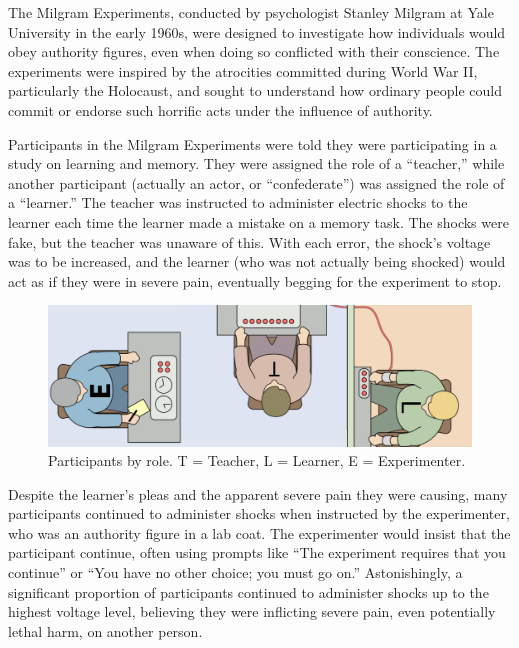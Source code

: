 \documentclass[
]{book}
\begin{document}
The Milgram Experiments, conducted by psychologist Stanley Milgram at Yale University in the early 1960s, were designed to investigate how individuals would obey authority figures, even when doing so conflicted with their conscience. The experiments were inspired by the atrocities committed during World War II, particularly the Holocaust, and sought to understand how ordinary people could commit or endorse such horrific acts under the influence of authority.

Participants in the Milgram Experiments were told they were participating in a study on learning and memory. They were assigned the role of a ``teacher,'' while another participant (actually an actor, or ``confederate'') was assigned the role of a ``learner.'' The teacher was instructed to administer electric shocks to the learner each time the learner made a mistake on a memory task. The shocks were fake, but the teacher was unaware of this. With each error, the shock's voltage was to be increased, and the learner (who was not actually being shocked) would act as if they were in severe pain, eventually begging for the experiment to stop.

\begin{figure}
\centering
\includegraphics[width=1\linewidth,height=\textheight,keepaspectratio]{images/Milgram_experiment.png}
\caption{Participants by role. T = Teacher, L = Learner, E = Experimenter.}
\end{figure}

Despite the learner's pleas and the apparent severe pain they were causing, many participants continued to administer shocks when instructed by the experimenter, who was an authority figure in a lab coat. The experimenter would insist that the participant continue, often using prompts like ``The experiment requires that you continue'' or ``You have no other choice; you must go on.'' Astonishingly, a significant proportion of participants continued to administer shocks up to the highest voltage level, believing they were inflicting severe pain, even potentially lethal harm, on another person.
\end{document}

